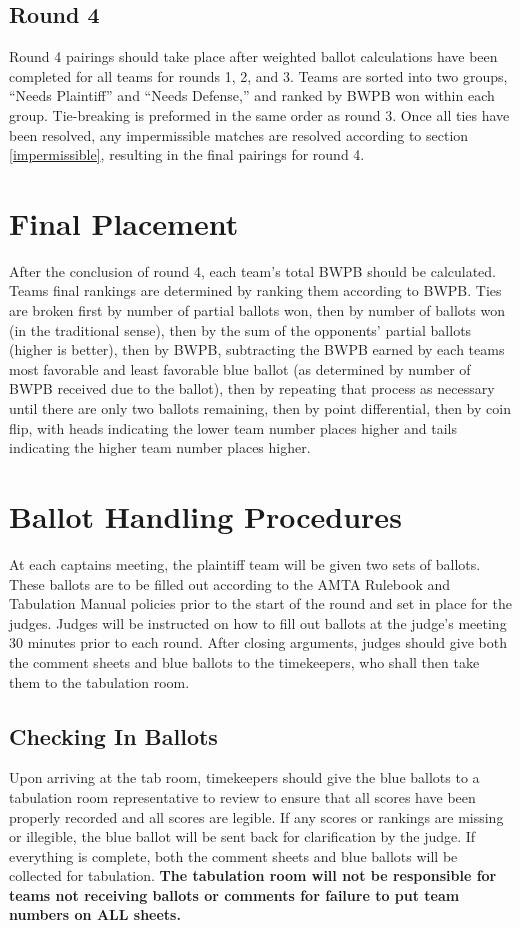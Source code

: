 \documentclass{article}
\begin{document}
\subsection{Round 4}
Round 4 pairings should take place after weighted ballot calculations have been completed for all teams for rounds 1, 2, and 3.  Teams are sorted into two groups, ``Needs Plaintiff'' and ``Needs Defense,'' and ranked by BWPB won within each group.  Tie-breaking is preformed in the same order as round 3.  Once all ties have been resolved, any impermissible matches are resolved according to section \ref{impermissible}, resulting in the final pairings for round 4.
\section{Final Placement}
After the conclusion of round 4, each team's total BWPB should be calculated.  Teams final rankings are determined by ranking them according to BWPB.  Ties are broken first by number of partial ballots won, then by number of ballots won (in the traditional sense), then by the sum of the opponents' partial ballots (higher is better), then by BWPB, subtracting the BWPB earned by each teams most favorable and least favorable blue ballot (as determined by number of BWPB received due to the ballot), then by repeating that process as necessary until there are only two ballots remaining, then by point differential, then by coin flip, with heads indicating the lower team number places higher and tails indicating the higher team number places higher.
\section{Ballot Handling Procedures}
At each captains meeting, the plaintiff team will be given two sets of ballots.  These ballots are to be filled out according to the AMTA Rulebook and Tabulation Manual policies prior to the start of the round and set in place for the judges.  Judges will be instructed on how to fill out ballots at the judge's meeting 30 minutes prior to each round.  After closing arguments, judges should give both the comment sheets and blue ballots to the timekeepers, who shall then take them to the tabulation room.
\subsection{Checking In Ballots}
Upon arriving at the tab room, timekeepers should give the blue ballots to a tabulation room representative to review to ensure that all scores have been properly recorded and all scores are legible.  If any scores or rankings are missing or illegible, the blue ballot will be sent back for clarification by the judge.  If everything is complete, both the comment sheets and blue ballots will be collected for tabulation.  \textbf{The tabulation room will not be responsible for teams not receiving ballots or comments for failure to put team numbers on ALL sheets.}
\end{document}
